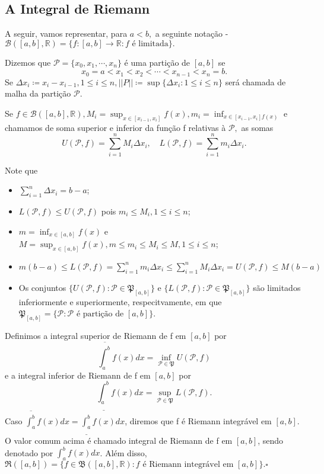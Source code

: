 \documentclass[analysis_notes.tex]{subfiles}
\begin{document}
\subsection{A Integral de Riemann}
A seguir, vamos representar, para \(a < b,\) a seguinte nota\c cão - \(\mathcal{B}([a,b], \mathbb{R})=\{f:[a,b]\rightarrow \mathbb{R}: f\text{ é limitada}\}.\)
\begin{def*}
	Dizemos que \(\mathcal{P}=\{x_{0}, x_{1}, \cdots, x_{n}\}\) é uma parti\c cão de \([a, b]\) se
	\[
		x_{0} = a < x_{1} < x_{2} < \cdots < x_{n-1} < x_{n} = b.
	\]
	Se \(\Delta x_{i}\coloneqq x_{i} - x_{i-1}, 1\leq i\leq n, ||P||\coloneqq \sup\{\Delta x_{i}: 1\leq i\leq n\}\) será chamada de
	malha da parti\c cão \(\mathcal{P}.\)

	Se \(f\in \mathcal{B}([a, b], \mathbb{R}), M_{i}=\sup_{x\in[x_{i-1},x_{i}]}f(x), m_{i}=\inf_{x\in[x_{i-1}, x_{i}]f(x)}\) e
	chamamos de soma superior e inferior da fun\c cão f relativas à \(\mathcal{P},\) as somas
	\[
		U(\mathcal{P}, f) = \sum\limits_{i=1}^{n}M_{i}\Delta x_{i},\quad L(\mathcal{P}, f)=\sum\limits_{i=1}^{n}m_{i}\Delta x_{i}.
	\]
\end{def*}
Note que
\begin{itemize}
	\item \(\sum\limits_{i=1}^{n}\Delta x_{i} = b-a\);
	\item \(L(\mathcal{P}, f)\leq U(\mathcal{P}, f)\) pois \(m_{i}\leq M_{i}, 1\leq i\leq n\);
	\item \(m=\inf_{x\in[a, b]}f(x)\) e \(M=\sup_{x\in[a, b]}f(x), m\leq m_{i}\leq M_{i}\leq M, 1\leq i\leq n\);
	\item \(m(b-a)\leq L(\mathcal{P}, f) = \sum\limits_{i=1}^{n}m_{i}\Delta x_{i}\leq \sum\limits_{i=1}^{n} M_{i}\Delta x_{i}=U(\mathcal{P}, f)\leq M(b-a)\)
	\item Os conjuntos \(\{U(\mathcal{P}, f): \mathcal{P}\in \mathfrak{P}_{[a, b]}\}\) e
	      \(\{L(\mathcal{P}, f): \mathcal{P}\in \mathfrak{P}_{[a, b]}\}\) são limitados inferiormente e superiormente, respecitvamente,
	      em que \(\mathfrak{P}_{[a, b]} = \{\mathcal{P}: \mathcal{P}\text{ é parti\c cão de }[a, b]\}\).
\end{itemize}
\begin{def*}
	Definimos a integral superior de Riemann de f em \([a, b]\) por
	\[
		\overline{\int_{a}^{b}}f(x)dx = \inf_{\mathcal{P}\in \mathfrak{P}}U(\mathcal{P}, f)
	\]
	e a integral inferior de Riemann de f em \([a, b]\) por
	\[
		\underline{\int_{a}^{b}}f(x)dx = \sup_{\mathcal{P}\in \mathfrak{P}}L(\mathcal{P}, f).
	\]
	Caso \(\overline{\int_{a}^{b}}f(x)dx = \underline{\int_{a}^{b}}f(x)dx\), diremos que f é Riemann
	integrável em \([a, b]\). O valor comum acima é chamado integral de Riemann de f em
	\([a, b]\), sendo denotado por \(\int_{a}^{b}f(x)dx\). Além disso,
	\(\mathfrak{R}([a, b]) = \{f\in \mathfrak{B}([a, b], \mathbb{R}): f\text{ é Riemann integrável em }[a, b]\}.\square\)
\end{def*}
\end{document}
